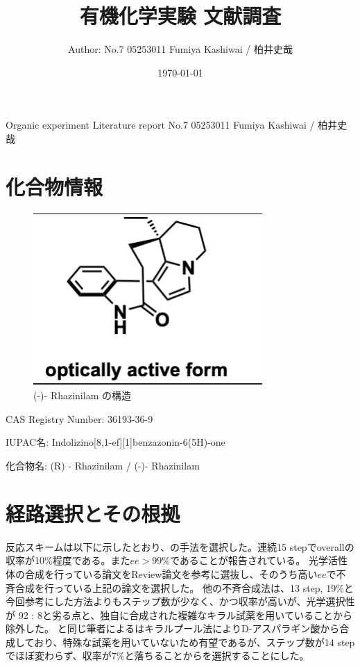 \documentclass{ltjsarticle}
\title{有機化学実験 文献調査}
\date{\today}
\author{Author: No.7 05253011 Fumiya Kashiwai / 柏井史哉}
\theoremstyle{definition}
\numberwithin{equation}{section}
\begin{document}
\maketitle
{} {Organic experiment Literature report No.7 05253011 Fumiya Kashiwai / 柏井史哉}
\section{化合物情報}
\begin{figure}[htbp]
\begin{center}
\includegraphics[width = 5 cm]{structure.png}
\caption{(-)- Rhazinilam の構造}
\label{default}
\end{center}
\end{figure}
CAS Registry Number: 36193-36-9

IUPAC名: Indolizino[8,1-ef][1]benzazonin-6(5H)-one

化合物名: (R) - Rhazinilam / (-)- Rhazinilam


\section{経路選択とその根拠}
反応スキームは以下に示したとおり、\cite{sugimoto_1}の手法を選択した。連続15 stepでoverallの収率が10\%程度である。また$ee > 99\%$であることが報告されている。
光学活性体の合成を行っている論文をReview論文\cite{Magnus}を参考に選抜し、そのうち高い$ee$で不斉合成を行っている上記の論文を選択した。
他の不斉合成法\cite{gau}は、13 step, 19\%と今回参考にした方法よりもステップ数が少なく、かつ収率が高いが、光学選択性が 92 : 8と劣る点と、独自に合成された複雑なキラル試薬を用いていることから除外した。
\cite{sugimoto_1}と同じ筆者による\cite{sugimoto_2}はキラルプール法によりD-アスパラギン酸から合成しており、特殊な試薬を用いていないため有望であるが、ステップ数が14 stepでほぼ変わらず、収率が7\%と落ちることから\cite{sugimoto_1}を選択することにした。
\end{document}
